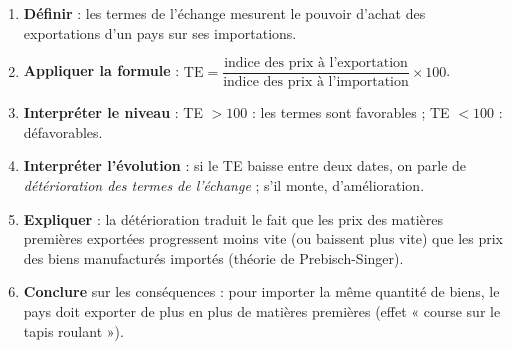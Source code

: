 \documentclass[11pt]{article}
\begin{document}
\begin{methode}
\begin{enumerate}
\item \textbf{Définir} : les termes de l'échange mesurent le pouvoir d'achat des exportations d'un pays sur ses importations.
\item \textbf{Appliquer la formule} : $\text{TE} = \dfrac{\text{indice des prix à l'exportation}}{\text{indice des prix à l'importation}} \times 100$.
\item \textbf{Interpréter le niveau} : TE $> 100$ : les termes sont favorables ; TE $< 100$ : défavorables.
\item \textbf{Interpréter l'évolution} : si le TE baisse entre deux dates, on parle de \emph{détérioration des termes de l'échange} ; s'il monte, d'amélioration.
\item \textbf{Expliquer} : la détérioration traduit le fait que les prix des matières premières exportées progressent moins vite (ou baissent plus vite) que les prix des biens manufacturés importés (théorie de Prebisch-Singer).
\item \textbf{Conclure} sur les conséquences : pour importer la même quantité de biens, le pays doit exporter de plus en plus de matières premières (effet « course sur le tapis roulant »).
\end{enumerate}
\end{methode}
\end{document}
